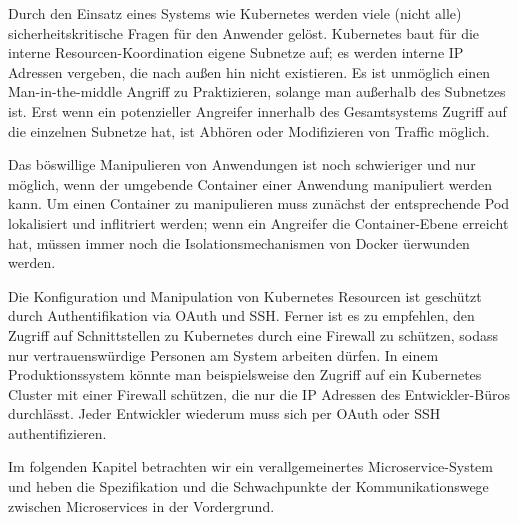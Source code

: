 Durch den Einsatz eines Systems wie Kubernetes werden viele (nicht alle) sicherheitskritische Fragen für den Anwender gelöst. Kubernetes baut für die interne Resourcen-Koordination eigene Subnetze auf; es werden interne IP Adressen vergeben, die nach außen hin nicht existieren. Es ist unmöglich einen Man-in-the-middle Angriff zu Praktizieren, solange man außerhalb des Subnetzes ist. Erst wenn ein potenzieller Angreifer innerhalb des Gesamtsystems Zugriff auf die einzelnen Subnetze hat, ist Abhören oder Modifizieren von Traffic möglich. 

Das böswillige Manipulieren von Anwendungen ist noch schwieriger und nur möglich, wenn der umgebende Container einer Anwendung manipuliert werden kann. Um einen Container zu manipulieren muss zunächst der entsprechende Pod lokalisiert und inflitriert werden; wenn ein Angreifer die Container-Ebene erreicht hat, müssen immer noch die Isolationsmechanismen von Docker üerwunden werden. 

Die Konfiguration und Manipulation von Kubernetes Resourcen ist geschützt durch Authentifikation via OAuth und SSH. Ferner ist es zu empfehlen, den Zugriff auf Schnittstellen zu Kubernetes durch eine Firewall zu schützen, sodass nur vertrauenswürdige Personen am System arbeiten dürfen. In einem Produktionssystem könnte man beispielsweise den Zugriff auf ein Kubernetes Cluster mit einer Firewall schützen, die nur die IP Adressen des Entwickler-Büros durchlässt. Jeder Entwickler wiederum muss sich per OAuth oder SSH authentifizieren.

Im folgenden Kapitel betrachten wir ein verallgemeinertes Microservice-System und heben die Spezifikation und die Schwachpunkte der Kommunikationswege zwischen Microservices in der Vordergrund.  
